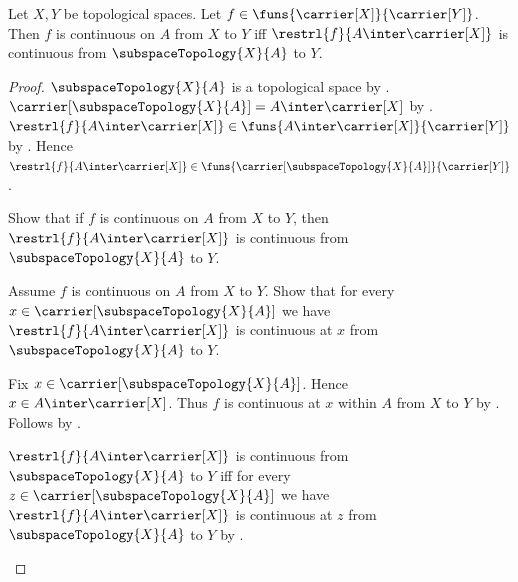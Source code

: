 \begin{theorem}\label{continuous_on_iff_restriction_continuous_from_subspace}
    Let $X,Y$ be topological spaces.
    Let $f\in\funs{\carrier[X]}{\carrier[Y]}$.
    Then $f$ is continuous on $A$ from $X$ to $Y$ iff
        $\restrl{f}{A\inter\carrier[X]}$ is continuous from
        $\subspaceTopology{X}{A}$ to $Y$.
\end{theorem}
\begin{proof}
    $\subspaceTopology{X}{A}$ is a topological space by
        .
    $\carrier[\subspaceTopology{X}{A}]=A\inter\carrier[X]$ by
        .
    $\restrl{f}{A\inter\carrier[X]}
        \in\funs{A\inter\carrier[X]}{\carrier[Y]}$ by
        .
    Hence $\restrl{f}{A\inter\carrier[X]}\in
        \funs{\carrier[\subspaceTopology{X}{A}]}{\carrier[Y]}$.

    Show that if $f$ is continuous on $A$ from $X$ to $Y$, then
        $\restrl{f}{A\inter\carrier[X]}$ is continuous from
            $\subspaceTopology{X}{A}$ to $Y$.
    \begin{subproof}
        Assume $f$ is continuous on $A$ from $X$ to $Y$.
        Show that for every
            $x\in\carrier[\subspaceTopology{X}{A}]$ we have
            $\restrl{f}{A\inter\carrier[X]}$ is continuous at $x$ from
            $\subspaceTopology{X}{A}$ to $Y$.
        \begin{subproof}
            Fix $x\in\carrier[\subspaceTopology{X}{A}]$.
            Hence $x\in A\inter\carrier[X]$.
            Thus $f$ is continuous at $x$ within $A$ from $X$ to $Y$ by
                .
            Follows by
                .
        \end{subproof}
        $\restrl{f}{A\inter\carrier[X]}$ is continuous from
            $\subspaceTopology{X}{A}$ to $Y$ iff for every
            $z\in\carrier[\subspaceTopology{X}{A}]$ we have
            $\restrl{f}{A\inter\carrier[X]}$ is continuous at $z$ from
            $\subspaceTopology{X}{A}$ to $Y$ by
            .
    \end{subproof}


\end{proof}
